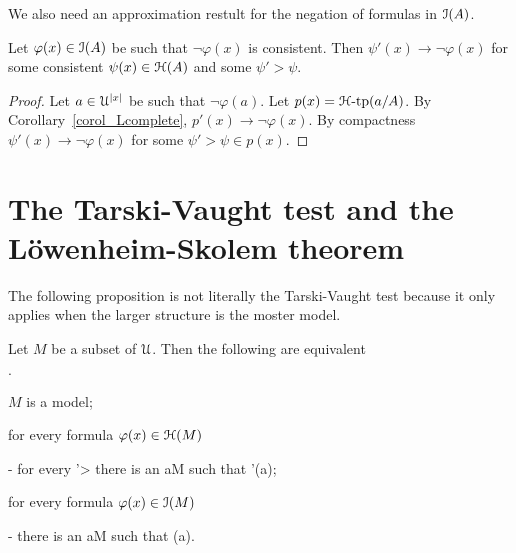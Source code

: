 \documentclass[10pt,oneside]{amsproc}
\newcommand{\mylabel}[1]{{#1}\hfill}
\renewenvironment{itemize}
  {\begin{list}{$\cdot$}{%
  \setlength{\parskip}{0mm}
  \setlength{\topsep}{.4\baselineskip}
  \setlength{\rightmargin}{0mm}
  \setlength{\listparindent}{0mm}
  \setlength{\itemindent}{0mm}
  \setlength{\labelwidth}{3ex}
  \setlength{\itemsep}{.2\baselineskip}
  \setlength{\parsep}{.2\baselineskip}
  \setlength{\partopsep}{0mm}
  \setlength{\labelsep}{1ex}
  \setlength{\leftmargin}{\labelwidth+\labelsep}
  \let\makelabel\mylabel}}{%
\end{list}}
\begin{document}
We also need an approximation restult for the negation of formulas in ${\EuScript I}(A)$.

\begin{proposition}\label{prop_LHapprox2}
  Let $\varphi(x)\in{\EuScript I}(A)$ be such that $\neg\varphi(x)$ is consistent.
  Then  $\psi'(x)\rightarrow\neg\varphi(x)$ for some consistent $\psi(x)\in{\EuScript H}(A)$ and some $\psi'>\psi$.
\end{proposition}



\begin{proof}
  Let $a\in {\EuScript U}^{|x|}$ be such that $\neg\varphi(a)$.
  Let $p(x)={\EuScript H}\mbox{-tp}(a/A)$.
  By Corollary~\ref{corol_Lcomplete}, $p'(x)\rightarrow\neg\varphi(x)$. 
  By compactness  $\psi'(x)\rightarrow\neg\varphi(x)$ for some $\psi'>\psi\in p(x)$. 
\end{proof}


\section{The Tarski-Vaught test and the L\"owenheim-Skolem theorem}

The following proposition is not literally the Tarski-Vaught test because it only applies when the larger structure is the moster model.

\begin{proposition}\label{prop_Tarski_Vaught}
  Let $M$ be a subset of ${\EuScript U}$.
  Then the following are equivalent
  \begin{itemize}
    \item[1.] $M$ is a model;
    \item[2.] for every formula $\varphi(x)\in{\EuScript H}(M)$
    
    \noindent\kern-\leftmargin
    {\textrm{ for every }\varphi'>\varphi\textrm{ there is an }a\in M\textrm{ such that }\varphi'(a);}
    \item[3.] for every formula $\varphi(x)\in{\EuScript I}(M)$
    
    \noindent\kern-\leftmargin
    {\textrm{ there is an }a\in M\textrm{ such that }\neg\varphi(a).}
    
  \end{itemize}
\end{proposition}
\end{document}
